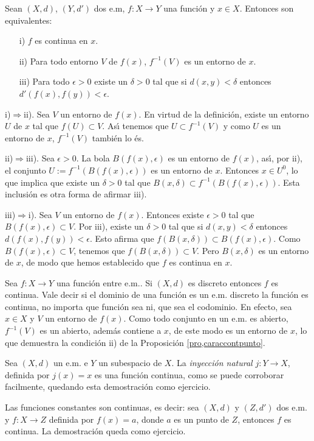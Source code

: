 \begin{proposicion}\label{pro,caraccontpunto} Sean $(X,d)$, $(Y,d')$ dos e.m, $f:X\rightarrow
Y$ una funci\'on y $x\in X$. Entonces son equivalentes:
\begin{itemize}
\item[i)] $f$ es continua en $x$.
\item[ii)] Para todo entorno $V$ de $f(x)$, $f^{-1}(V)$ es un
entorno de $x$.
\item[iii)]Para todo $\epsilon>0$ existe un $\delta>0$ tal que
si $d(x,y)<\delta$ entonces  $d'(f(x),f(y))<\epsilon$.
\end{itemize}
\end{proposicion}
\begin{demo} i)$\Rightarrow$ii). Sea $V$ un entorno  de $f(x)$.
En virtud de la definici\'on, existe un entorno $U$ de $x$ tal que
$f(U)\subset V$. As\'{\i} tenemos que $U\subset f^{-1}(V)$ y como
$U$ es un entorno de $x$, $f^{-1}(V)$ tambi\'en lo \'es.

ii)$\Rightarrow$iii). Sea $\epsilon>0$. La bola $B(f(x),\epsilon)$
es un entorno de $f(x)$, as\'{\i}, por ii), el conjunto
$U:=f^{-1}(B(f(x),\epsilon))$ es un entorno de $x$. Entonces $x\in
U^0$, lo que implica que existe un $\delta>0$ tal que
$B(x,\delta)\subset f^{-1}(B(f(x),\epsilon))$. Esta inclusi\'on es
otra forma de afirmar iii).

iii)$\Rightarrow$i). Sea $V$ un entorno de $f(x)$. Entonces existe
$\epsilon>0$ tal que $B(f(x),\epsilon)\subset V$. Por iii), existe
un $\delta>0$ tal que si $d(x,y)<\delta$ entonces
$d(f(x),f(y))<\epsilon$. Esto afirma que $f(B(x,\delta))\subset
B(f(x),\epsilon)$. Como $B(f(x),\epsilon)\subset V$, tenemos que
$f(B(x,\delta))\subset V$. Pero $B(x,\delta)$ es un entorno de
$x$, de modo que hemos establecido que $f$ es continua en $x$.
\end{demo}
\begin{ejemplo} Sea $f:X\rightarrow Y$ una funci\'on entre
e.m.. Si $(X,d)$ es discreto entonces $f$ es continua. Vale decir
si el dominio de una funci\'on es un e.m. discreto la funci\'on es
continua, no importa que funci\'on sea ni, que sea el codominio.
En efecto, sea $x\in X$ y $V$ un entorno de $f(x)$. Como todo
conjunto en un e.m. es abierto, $f^{-1}(V)$ es un abierto,
adem\'as contiene a $x$, de este modo es un entorno de $x$, lo que
demuestra la condici\'on ii) de la Proposici\'on
\vref{pro,caraccontpunto}.
\end{ejemplo}
\begin{ejemplo} Sea $(X,d)$ un e.m. e $Y$ un subespacio de $X$. La
\emph{inyecci\'on natural} $j:Y\rightarrow X$, definida por
$j(x)=x$ es una funci\'on continua, como se puede corroborar
facilmente, quedando esta demostraci\'on como ejercicio.
\end{ejemplo}
\begin{ejemplo} Las funciones constantes son continuas, es decir:
sea $(X,d)$ y $(Z,d')$ dos e.m. y $f:X\rightarrow Z$ definida por
$f(x)=a$, donde $a$ es un punto de $Z$, entonces $f$ es continua.
La demostraci\'on queda como ejercicio.
\end{ejemplo}

